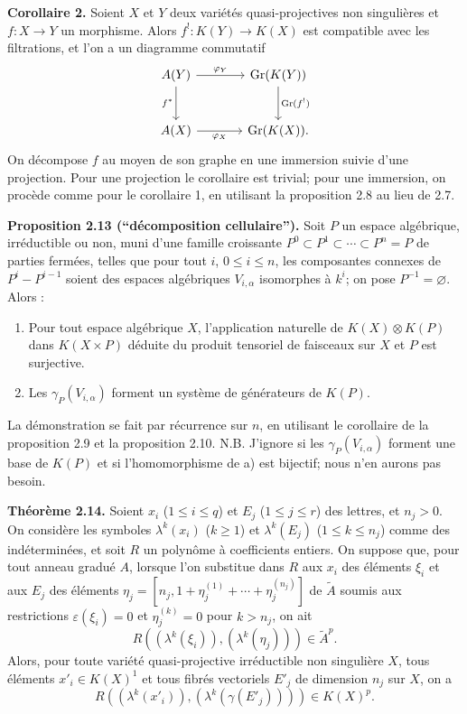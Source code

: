 \documentclass[11pt]{article}
\newcommand{\Gr}{\operatorname{Gr}}
\providecommand{\Gr}{\operatorname{Gr}}
\providecommand{\Atil}{\widetilde A}
\providecommand{\Gr}{\operatorname{G}}
\begin{document}
\textbf{Corollaire 2.} Soient $X$ et $Y$ deux variétés quasi-projectives non singulières et $f:X\to Y$ un morphisme. Alors $f^!:K(Y)\to K(X)$ est compatible avec les filtrations, et l'on a un diagramme commutatif
\[
\begin{tikzcd}[column sep=large,row sep=large]
A(Y) \arrow[r,"\varphi_Y"] \arrow[d,"f^*"'] & \Gr(K(Y)) \arrow[d,"\Gr(f^!)"]\\
A(X) \arrow[r,"\varphi_X"'] & \Gr(K(X)).
\end{tikzcd}
\]
On décompose $f$ au moyen de son graphe en une immersion suivie d'une projection. Pour une projection le corollaire est trivial; pour une immersion, on procède comme pour le corollaire 1, en utilisant la proposition 2.8 au lieu de 2.7.

\textbf{Proposition 2.13 (``décomposition cellulaire'').} Soit $P$ un espace algébrique, irréductible ou non, muni d'une famille croissante $P^0\subset P^1\subset\cdots\subset P^n=P$ de parties fermées, telles que pour tout $i$, $0\leq i\leq n$, les composantes connexes de $P^i-P^{i-1}$ soient des espaces algébriques $V_{i,\alpha}$ isomorphes à $k^i$; on pose $P^{-1}=\varnothing$. Alors :
\begin{enumerate}[label=\alph*)]
\item Pour tout espace algébrique $X$, l'application naturelle de $K(X)\otimes K(P)$ dans $K(X\times P)$ déduite du produit tensoriel de faisceaux sur $X$ et $P$ est surjective.
\item Les $\gamma_P(V_{i,\alpha})$ forment un système de générateurs de $K(P)$.
\end{enumerate}
La démonstration se fait par récurrence sur $n$, en utilisant le corollaire de la proposition 2.9 et la proposition 2.10. N.B. J'ignore si les $\gamma_P(V_{i,\alpha})$ forment une base de $K(P)$ et si l'homomorphisme de a) est bijectif; nous n'en aurons pas besoin.

\textbf{Théorème 2.14.} Soient $x_i$ ($1\leq i\leq q$) et $E_j$ ($1\leq j\leq r$) des lettres, et $n_j>0$. On considère les symboles $\lambda^k(x_i)$ ($k\geq1$) et $\lambda^k(E_j)$ ($1\leq k\leq n_j$) comme des indéterminées, et soit $R$ un polynôme à coefficients entiers. On suppose que, pour tout anneau gradué $A$, lorsque l'on substitue dans $R$ aux $x_i$ des éléments $\xi_i$ et aux $E_j$ des éléments $\eta_j=[n_j,1+\eta_j^{(1)}+\cdots+\eta_j^{(n_j)}]$ de $\Atil$ soumis aux restrictions $\varepsilon(\xi_i)=0$ et $\eta_j^{(k)}=0$ pour $k>n_j$, on ait
\[
 R((\lambda^k(\xi_i)),(\lambda^k(\eta_j)))\in\Atil^p.
\]
Alors, pour toute variété quasi-projective irréductible non singulière $X$, tous éléments $x'_i\in K(X)^1$ et tous fibrés vectoriels $E'_j$ de dimension $n_j$ sur $X$, on a
\begin{equation}\tag{*}
 R((\lambda^k(x'_i)),(\lambda^k(\gamma(E'_j))))\in K(X)^p.
\end{equation}
\end{document}
